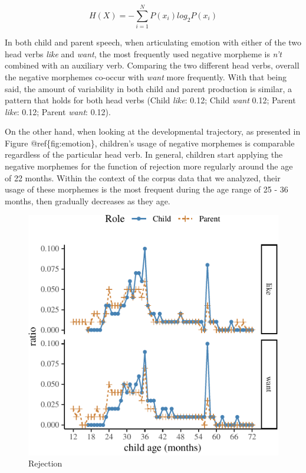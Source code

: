 \documentclass[10pt, letterpaper]{article}
\newenvironment{CodeChunk}{}{}
\begin{document}
\[
H(X) = -\sum_{i=1}^N P(x_i)log_2P(x_i)               
\]

In both child and parent speech, when articulating emotion with either
of the two head verbs \emph{like} and \emph{want}, the most frequently
used negative morpheme is \emph{n't} combined with an auxiliary verb.
Comparing the two different head verbs, overall the negative morphemes
co-occur with \emph{want} more frequently. With that being said, the
amount of variability in both child and parent production is similar, a
pattern that holds for both head verbs (Child \emph{like}: 0.12; Child
\emph{want} 0.12; Parent \emph{like}: 0.12; Parent \emph{want}: 0.12).

On the other hand, when looking at the developmental trajectory, as
presented in Figure @ref\{fig:emotion\}, children's usage of negative
morphemes is comparable regardless of the particular head verb. In
general, children start applying the negative morphemes for the function
of rejection more regularly around the age of 22 months. Within the
context of the corpus data that we analyzed, their usage of these
morphemes is the most frequent during the age range of 25 - 36 months,
then gradually decreases as they age.

\begin{CodeChunk}
\begin{figure}[H]

{\centering \includegraphics{figs/emotion-1} 

}

\caption[Rejection]{Rejection}\label{fig:emotion}
\end{figure}
\end{CodeChunk}
\end{document}
